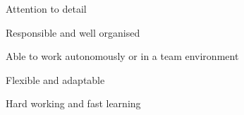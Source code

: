 \newline

\begin{cvparagraph}

\begin{cvitems}
  \item Attention to detail
  \item Responsible and well organised
  \item Able to work autonomously or in a team environment
  \item Flexible and adaptable
  \item Hard working and fast learning
\end{cvitems}
\end{cvparagraph}



